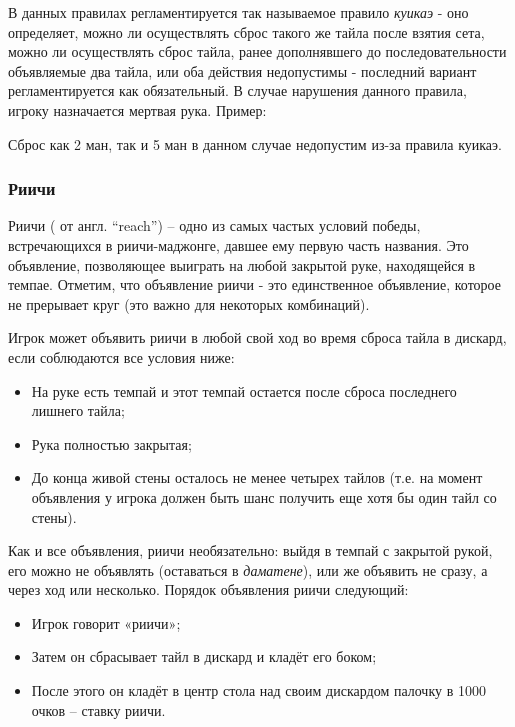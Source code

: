 В данных правилах регламентируется так называемое правило \textit{куикаэ} - оно определяет, можно ли осуществлять сброс такого же тайла после взятия сета, можно ли осуществлять сброс тайла, ранее дополнявшего до последовательности объявляемые два тайла, или оба действия недопустимы - последний вариант регламентируется как обязательный. В случае нарушения данного правила, игроку назначается мертвая рука. Пример:

 \hfill {}

Сброс как 2 ман, так и 5 ман в данном случае недопустим из-за правила куикаэ.

\subsubsection{Риичи}

Риичи ( от англ. “reach”) – одно из самых частых условий победы, встречающихся в риичи-маджонге, давшее ему первую часть названия. Это объявление, позволяющее выиграть на любой закрытой руке, находящейся в темпае. Отметим, что объявление риичи - это единственное объявление, которое не прерывает круг (это важно для некоторых комбинаций).

Игрок может объявить риичи в любой свой ход во время сброса тайла в дискард, если соблюдаются все условия ниже:

\begin{itemize}
	\item На руке есть темпай и этот темпай остается после сброса последнего лишнего тайла;
	\item Рука полностью закрытая;
	\item До конца живой стены осталось не менее четырех тайлов (т.е. на момент объявления у игрока должен быть шанс получить еще хотя бы один тайл со стены).
\end{itemize}

Как и все объявления, риичи необязательно: выйдя в темпай с закрытой рукой, его можно не объявлять (оставаться в \textit{даматене}), или же объявить не сразу, а через ход или несколько. Порядок объявления риичи следующий:

\begin{itemize}
	\item Игрок говорит «риичи»;
	\item Затем он сбрасывает тайл в дискард и кладёт его боком;
	\item После этого он кладёт в центр стола над своим дискардом палочку в 1000 очков – ставку риичи.
\end{itemize}

